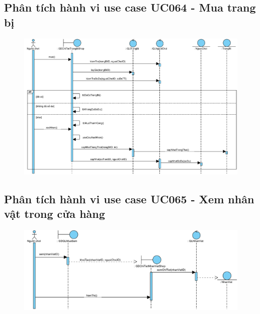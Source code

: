 \documentclass[3p]{elsarticle}
\begin{document}
\subsection{Phân tích hành vi use case UC064 - Mua trang bị}
\begin{figure}[!htbp]
	\hspace*{-.5in}
	\centering
	\includegraphics[scale=.55]{images/sequence-pdfs/gamer/ShopManagement_BuyItem.pdf}
\end{figure}
\newpage

\subsection{Phân tích hành vi use case UC065 - Xem nhân vật trong cửa hàng}
\begin{figure}[!htbp]
	\hspace*{-.5in}
	\centering
	\includegraphics[scale=.55]{images/sequence-pdfs/gamer/ShopManagement_ViewCharacter.pdf}
\end{figure}
\end{document}
